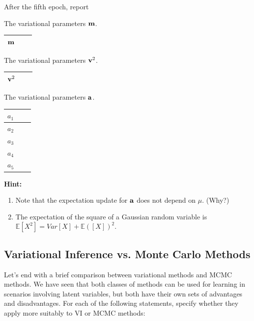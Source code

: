\documentclass[11pt,addpoints,answers]{exam}
\numberwithin{equation}{section} %
\numberwithin{figure}{section} %
\numberwithin{table}{section} %
\begin{document}
After the fifth epoch, report
\begin{questions}
\question[2] The variational parameters $\mathbf{m}$.
\begin{center}
 \begin{tabular}{ |c|p{2cm}|p{2cm}|} 
 \hline
 \textbf{$\mathbf{m}$} & & \\
 \hline
 
\end{tabular}
\end{center}


\question[2] The variational parameters $\mathbf{v}^2$.
\begin{center}
 \begin{tabular}{ |c|p{2cm}|p{2cm}|} 
 \hline
 \textbf{$\mathbf{v}^2$} & & \\
 \hline
 
\end{tabular}
\end{center}
\question[2] The variational parameters $\mathbf{a}$.
\begin{center}
 \begin{tabular}{ |c|p{2cm}|p{2cm}|} 
 \hline
 \textbf{$a_1$} & & \\
 \hline
 \textbf{$a_2$} & & \\
 \hline
 \textbf{$a_3$} & & \\
 \hline
 \textbf{$a_4$} & & \\
 \hline
 \textbf{$a_5$} & & \\
 \hline
 
\end{tabular}
\end{center}

\textbf{Hint:} 
\begin{enumerate}
    \item Note that the expectation update for $\mathbf{a}$ does not depend on $\mu$. (Why?)
    \item The expectation of the square of a Gaussian random variable is $\mathbb{E}[X^2] = Var[X] + \mathbb{E}([X])^2$.
\end{enumerate}
\end{questions}{}

\subsection{Variational Inference vs. Monte Carlo Methods}
Let's end with a brief comparison between variational methods and MCMC methods. We have seen that both classes of methods can be used for learning in scenarios involving latent variables, but both have their own sets of advantages and disadvantages. For each of the following statements, specify whether they apply more suitably to VI or MCMC methods:
\end{document}
